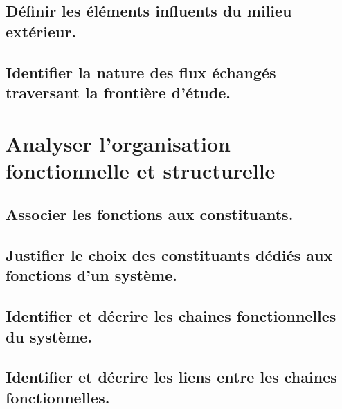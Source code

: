 \documentclass[10pt,fleqn]{book}
\newcommand{\repRel}{../..}
\newcommand{\repStyle}{\repRel/Style}
\newcommand{\td}{fichier_td}
\newcommand{\repExos}{\repRel/ExercicesCompetences}
\newcommand{\repExo}{dossier}
\begin{document}
\subsection{Définir les éléments influents du milieu extérieur. } 

\subsection{Identifier la nature des flux échangés traversant la frontière d’étude.} 

\section{Analyser l'organisation fonctionnelle et structurelle} 

\subsection{Associer les fonctions aux constituants.} 

\renewcommand{\repExo}{\repExos/A3_AnalyseFonctionnelleStructurelle/A3_01_ChaineFonctionnelle/58_Oz440}
\renewcommand{\td}{58_Oz440}
\graphicspath{{\repStyle/png/}{\repExo/images/}}


\renewcommand{\repExo}{\repExos/A3_AnalyseFonctionnelleStructurelle/A3_01_ChaineFonctionnelle/59_Levage}
\renewcommand{\td}{59_Levage}
\graphicspath{{\repStyle/png/}{\repExo/images/}}


\renewcommand{\repExo}{\repExos/A3_AnalyseFonctionnelleStructurelle/A3_01_ChaineFonctionnelle/60_Escalier}
\renewcommand{\td}{60_Escalier}
\graphicspath{{\repStyle/png/}{\repExo/images/}}


\subsection{Justifier le choix des constituants dédiés aux fonctions d’un système.} 

\subsection{Identifier et décrire les chaines fonctionnelles du système.} 

\subsection{Identifier et décrire les liens entre les chaines fonctionnelles.} 
\end{document}
